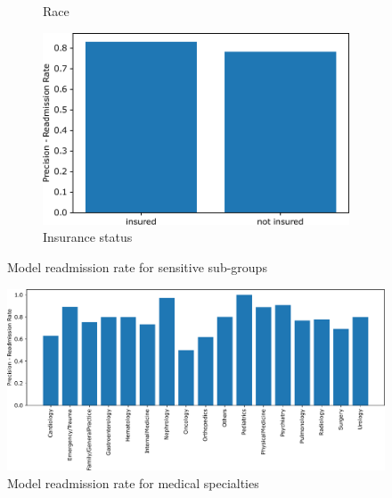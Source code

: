 \documentclass[a4paper,11pt]{article}
\begin{document}
\begin{figure}[htb]
\begin{subfigure}{0.49\textwidth}
    \caption{Race}
    \label{fig:discrim_req_sensitive_race}
\end{subfigure}
\hfill
\begin{subfigure}{0.49\textwidth}
    \includegraphics[width=\textwidth]{images/discrimination_requirement_is_insured.pdf}
    \caption{Insurance status}
    \label{fig:discrim_req_sensitive_is_insured}
\end{subfigure}
\caption{Model readmission rate for sensitive sub-groups}
\label{fig:discrim_req_sensitive}
\end{figure}

\begin{figure}[!htb]
	\centering
	\includegraphics[width=1\textwidth]{images/discrimination_requirement_medical_specialty.pdf}
	\caption{Model readmission rate for medical specialties}
	\label{fig:discrim_req_medical_specialty}
\end{figure}
\end{document}
